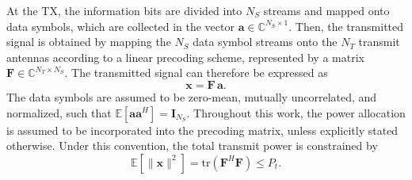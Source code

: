 At the \ac{TX}, the information bits are divided into $N_S$ streams and mapped onto data symbols, which are collected in the vector $\mathbf{a} \in \mathbb{C}^{N_S \times 1}$.
Then, the transmitted signal is obtained by mapping the $N_S$ data symbol streams onto the $N_T$ transmit antennas according to a linear precoding scheme, represented by a matrix $\mathbf{F} \in \mathbb{C}^{N_T \times N_S}$.
The transmitted signal can therefore be expressed as
\begin{equation}
    \mathbf{x} = \mathbf{F} \, \mathbf{a}.
\label{eq:su_mimo_precoding}
\end{equation}
The data symbols are assumed to be zero-mean, mutually uncorrelated, and normalized, such that $ \mathbb{E}\!\left[\mathbf{a}\mathbf{a}^H\right] = \mathbf{I}_{N_S} $.
Throughout this work, the power allocation is assumed to be incorporated into the precoding matrix, unless explicitly stated otherwise. Under this convention, the total transmit power is constrained by
\begin{equation}
    \mathbb{E}\!\left[\|\mathbf{x}\|^2\right] = \mathrm{tr}\!\left(\mathbf{F}^H \mathbf{F}\right) \leq P_t.
\end{equation}

